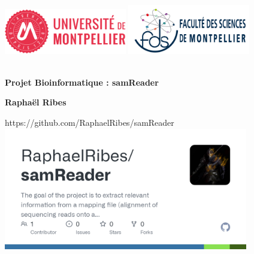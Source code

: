 \documentclass[11pt]{article}
\begin{document}
\begin{titlepage}
    \begin{center}
        \includegraphics[width=0.4\textwidth]{UM} \hfill{} %
        \includegraphics[width=0.4\textwidth]{FDS} %

        \vspace{3cm}

        \hrulefill\\[0.4cm]
        {\Huge \textbf{Projet Bioinformatique : samReader}}\\[0.4cm]
        \hrulefill

        \vspace{1.5cm}

        \large{\textbf{Raphaël Ribes}}\\[0.5cm]

        \vfill

        https://github.com/RaphaelRibes/samReader
        \href{https://github.com/RaphaelRibes/samReader}{%
            \includegraphics[width=0.8\textwidth]{samReader} %
        }
    \end{center}
\end{titlepage}
\end{document}
